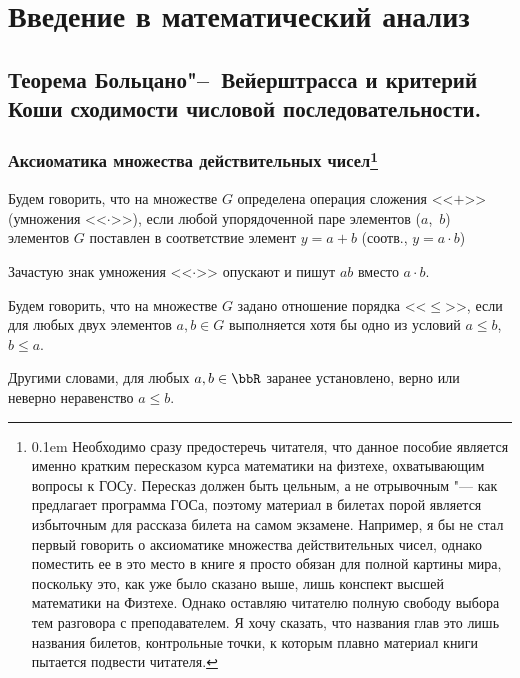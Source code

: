 \part{Введение в математический анализ}
\chapter{Теорема Больцано"--~Вейерштрасса и критерий Коши сходимости числовой последовательности.}

\section[Аксиоматика множества действительных чисел]{Аксиоматика множества действительных чисел\footnote{\leavevmode\vspace*{-\baselineskip}
%
\mbox{\kern0.1em}
Необходимо сразу предостеречь читателя, что данное пособие является именно кратким пересказом курса математики на физтехе, охватывающим вопросы к ГОСу. Пересказ должен быть цельным, а не отрывочным "--- как предлагает программа ГОСа, поэтому материал в билетах порой является избыточным для рассказа билета на самом экзамене. Например, я бы не стал первый говорить о аксиоматике множества действительных чисел, однако поместить ее в это место в книге я просто обязан для полной картины мира, поскольку это, как уже было сказано выше, лишь конспект высшей математики на Физтехе. Однако оставляю читателю полную свободу выбора тем разговора с преподавателем. Я хочу сказать, что названия глав это лишь названия билетов, контрольные точки, к которым плавно материал книги пытается подвести читателя.
}
}

\begin{defn}
Будем говорить, что на множестве $G$ определена операция сложения <<$+$>> (умножения <<$\cdot$>>), если любой упорядоченной паре элементов ($a$,~$b$) элементов $G$ поставлен в соответствие элемент $y = a + b$ (соотв., $y = a\cdot b$)
\end{defn}

Зачастую знак умножения <<$\cdot$>> опускают и пишут $ab$ вместо $a\cdot b$.

\begin{defn}
Будем говорить, что на множестве $G$ задано отношение порядка <<$\le$>>, если для любых двух элементов $a,b\in G$ выполняется хотя бы одно из условий $a\le b$, $b \le a$.
\end{defn}

Другими словами, для любых $a, b \in \bbR$ заранее установлено, верно или неверно неравенство $a \le b$.

